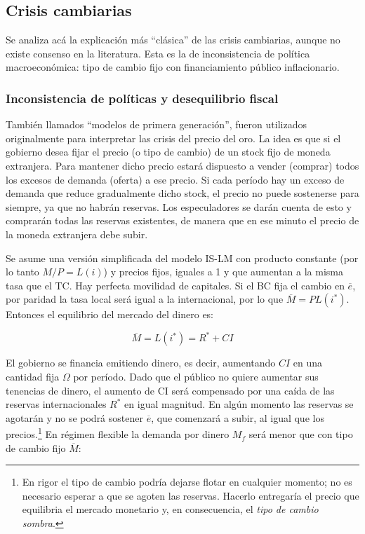 \documentclass[DeGregorioResumen]{subfiles}
\begin{document}
\subsection{Crisis cambiarias}

Se analiza acá la explicación más ``clásica'' de las crisis cambiarias, aunque no existe consenso en la literatura. Esta es la de inconsistencia de política macroeconómica: tipo de cambio fijo con financiamiento público inflacionario.

\subsubsection{Inconsistencia de políticas y desequilibrio fiscal}

También llamados ``modelos de primera generación'', fueron utilizados originalmente para interpretar las crisis del precio del oro. La idea es que si el gobierno desea fijar el precio (o tipo de cambio) de un stock fijo de moneda extranjera. Para mantener dicho precio estará dispuesto a vender (comprar) todos los excesos de demanda (oferta) a ese precio. Si cada período hay un exceso de demanda que reduce gradualmente dicho stock, el precio no puede sostenerse para siempre, ya que no habrán reservas. Los especuladores se darán cuenta de esto y comprarán todas las reservas existentes, de manera que en ese minuto el precio de la moneda extranjera debe subir.

Se asume una versión simplificada del modelo IS-LM con producto constante (por lo tanto $M/P=L(i)$) y precios fijos, iguales a 1 y que aumentan a la misma tasa que el TC. Hay perfecta movilidad de capitales. Si el BC fija el cambio en $\overline e$, por paridad la tasa local será igual a la internacional, por lo que $\overline M=PL(i^*)$. Entonces el equilibrio del mercado del dinero es:

\begin{equation}
	\overline M = L(i^*) = R^* + CI
\end{equation}

El gobierno se financia emitiendo dinero, es decir, aumentando $CI$ en una cantidad fija $\Omega$ por período. Dado que el público no quiere aumentar sus tenencias de dinero, el aumento de CI será compensado por una caída de las reservas internacionales $R^*$ en igual magnitud. En algún momento las reservas se agotarán y no se podrá sostener $\overline e$, que comenzará a subir, al igual que los precios.\footnote{En rigor el tipo de cambio podría dejarse flotar en cualquier momento; no es necesario esperar a que se agoten las reservas. Hacerlo entregaría el precio que equilibria el mercado monetario y, en consecuencia, el \textit{tipo de cambio sombra}.} En régimen flexible la demanda por dinero $M_f$ será menor que con tipo de cambio fijo $\overline M$:
\end{document}
